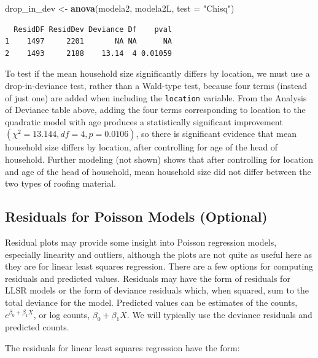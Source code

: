 \documentclass[
]{krantz}
\newenvironment{Shaded}{\begin{snugshade}}{\end{snugshade}}
\newcommand{\DataTypeTok}[1]{\textcolor[rgb]{0.27,0.27,0.27}{#1}}
\newcommand{\KeywordTok}[1]{\textcolor[rgb]{0.27,0.27,0.27}{\textbf{#1}}}
\newcommand{\NormalTok}[1]{#1}
\newcommand{\StringTok}[1]{\textcolor[rgb]{0.5,0.5,0.5}{#1}}
\begin{document}
\begin{Shaded}
\begin{Highlighting}[]
\NormalTok{drop_in_dev <-}\StringTok{ }\KeywordTok{anova}\NormalTok{(modela2, modela2L, }\DataTypeTok{test =} \StringTok{"Chisq"}\NormalTok{)}
\end{Highlighting}
\end{Shaded}

\begin{verbatim}
  ResidDF ResidDev Deviance Df    pval
1    1497     2201       NA NA      NA
2    1493     2188    13.14  4 0.01059
\end{verbatim}

To test if the mean household size significantly differs by location, we must use a drop-in-deviance test, rather than a Wald-type test, because four terms (instead of just one) are added when including the \texttt{location} variable. From the Analysis of Deviance table above, adding the four terms corresponding to location to the quadratic model with age produces a statistically significant improvement \((\chi^2=13.144, df = 4, p=0.0106)\), so there is significant evidence that mean household size differs by location, after controlling for age of the head of household. Further modeling (not shown) shows that after controlling for location and age of the head of household, mean household size did not differ between the two types of roofing material.

\hypertarget{sec-PoisResid}{%
\subsection{Residuals for Poisson Models (Optional)}\label{sec-PoisResid}}

Residual plots may provide some insight into Poisson regression models, especially linearity and outliers, although the plots are not quite as useful here as they are for linear least squares regression. There are a few options for computing residuals and predicted values. Residuals may have the form of residuals for LLSR models or the form of deviance residuals which, when squared, sum to the total deviance for the model. Predicted values can be estimates of the counts, \(e^{\beta_0+\beta_1X}\), or log counts, \(\beta_0+\beta_1X\). We will typically use the deviance residuals and predicted counts.

The residuals for linear least squares regression have the form:
\end{document}
